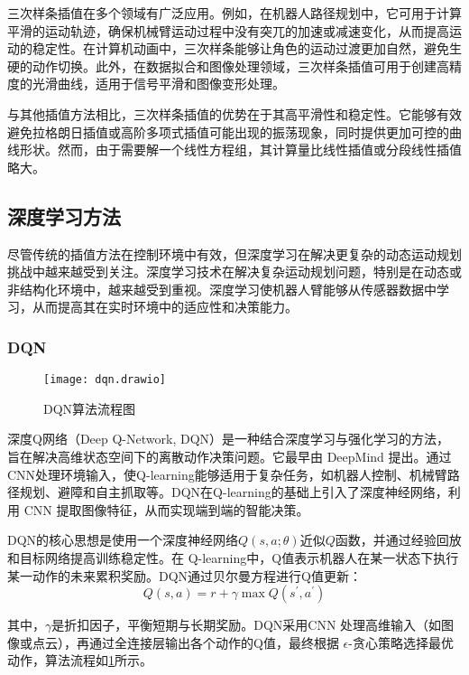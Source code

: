 三次样条插值在多个领域有广泛应用。例如，在机器人路径规划中，它可用于计算平滑的运动轨迹，确保机械臂运动过程中没有突兀的加速或减速变化，从而提高运动的稳定性。在计算机动画中，三次样条能够让角色的运动过渡更加自然，避免生硬的动作切换。此外，在数据拟合和图像处理领域，三次样条插值可用于创建高精度的光滑曲线，适用于信号平滑和图像变形处理。

与其他插值方法相比，三次样条插值的优势在于其高平滑性和稳定性。它能够有效避免拉格朗日插值或高阶多项式插值可能出现的振荡现象，同时提供更加可控的曲线形状。然而，由于需要解一个线性方程组，其计算量比线性插值或分段线性插值略大。


\subsection{深度学习方法}
尽管传统的插值方法在控制环境中有效，但深度学习在解决更复杂的动态运动规划挑战中越来越受到关注。深度学习技术在解决复杂运动规划问题，特别是在动态或非结构化环境中，越来越受到重视。深度学习使机器人臂能够从传感器数据中学习，从而提高其在实时环境中的适应性和决策能力。

\subsubsection{DQN}
 \begin{figure}[htb]
	\texttt{[image: dqn.drawio]}
	\caption[DQN算法流程图]{DQN算法流程图} %
	\label{fig:dqn.drawio}
\end{figure}
深度Q网络（Deep Q-Network, DQN）是一种结合深度学习与强化学习的方法，旨在解决高维状态空间下的离散动作决策问题。它最早由 DeepMind 提出。通过CNN处理环境输入，使Q-learning能够适用于复杂任务，如机器人控制、机械臂路径规划、避障和自主抓取等。DQN在Q-learning的基础上引入了深度神经网络，利用 CNN 提取图像特征，从而实现端到端的智能决策。

DQN的核心思想是使用一个深度神经网络$Q(s,a;\theta)$近似$Q$函数，并通过经验回放和目标网络提高训练稳定性。在 Q-learning中，Q值表示机器人在某一状态下执行某一动作的未来累积奖励。DQN通过贝尔曼方程进行Q值更新：
\begin{equation}
	\label{equ:DQN}
	Q(s,a) = r + \gamma\max Q(s^{\prime},a^{\prime})
\end{equation}

其中，$\gamma$是折扣因子，平衡短期与长期奖励。DQN采用CNN 处理高维输入（如图像或点云），再通过全连接层输出各个动作的Q值，最终根据 $\epsilon$-贪心策略选择最优动作，算法流程如\cref{fig:dqn.drawio}所示。

